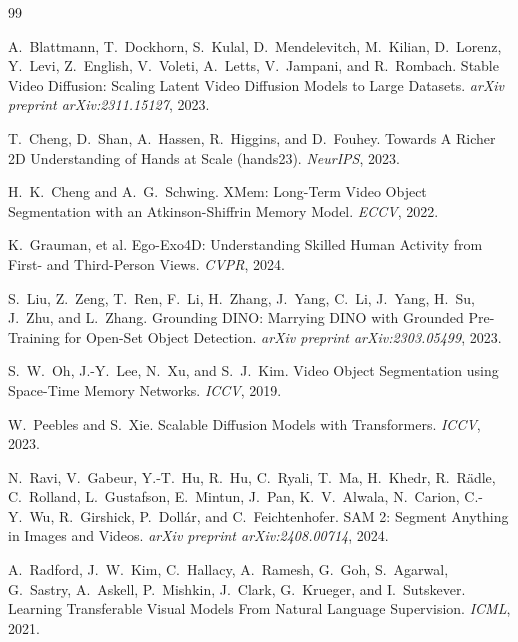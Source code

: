 \documentclass{article} %
\begin{document}

\begin{thebibliography}{99}

A.\ Blattmann, T.\ Dockhorn, S.\ Kulal, D.\ Mendelevitch, M.\ Kilian,
D.\ Lorenz, Y.\ Levi, Z.\ English, V.\ Voleti, A.\ Letts, V.\ Jampani, and
R.\ Rombach.
\newblock Stable Video Diffusion: Scaling Latent Video Diffusion Models to
Large Datasets.
\newblock \emph{arXiv preprint arXiv:2311.15127}, 2023.

T.\ Cheng, D.\ Shan, A.\ Hassen, R.\ Higgins, and D.\ Fouhey.
\newblock Towards A Richer 2D Understanding of Hands at Scale (hands23).
\newblock \emph{NeurIPS}, 2023.

H.\ K.\ Cheng and A.\ G.\ Schwing.
\newblock XMem: Long-Term Video Object Segmentation with an Atkinson-Shiffrin
Memory Model.
\newblock \emph{ECCV}, 2022.

K.\ Grauman, et al.
\newblock Ego-Exo4D: Understanding Skilled Human Activity from First- and
Third-Person Views.
\newblock \emph{CVPR}, 2024.

S.\ Liu, Z.\ Zeng, T.\ Ren, F.\ Li, H.\ Zhang, J.\ Yang, C.\ Li, J.\ Yang,
H.\ Su, J.\ Zhu, and L.\ Zhang.
\newblock Grounding DINO: Marrying DINO with Grounded Pre-Training for
Open-Set Object Detection.
\newblock \emph{arXiv preprint arXiv:2303.05499}, 2023.

S.\ W.\ Oh, J.-Y.\ Lee, N.\ Xu, and S.\ J.\ Kim.
\newblock Video Object Segmentation using Space-Time Memory Networks.
\newblock \emph{ICCV}, 2019.

W.\ Peebles and S.\ Xie.
\newblock Scalable Diffusion Models with Transformers.
\newblock \emph{ICCV}, 2023.

N.\ Ravi, V.\ Gabeur, Y.-T.\ Hu, R.\ Hu, C.\ Ryali, T.\ Ma, H.\ Khedr,
R.\ R\"adle, C.\ Rolland, L.\ Gustafson, E.\ Mintun, J.\ Pan, K.\ V.\ Alwala,
N.\ Carion, C.-Y.\ Wu, R.\ Girshick, P.\ Doll\'ar, and C.\ Feichtenhofer.
\newblock SAM 2: Segment Anything in Images and Videos.
\newblock \emph{arXiv preprint arXiv:2408.00714}, 2024.

A.\ Radford, J.\ W.\ Kim, C.\ Hallacy, A.\ Ramesh, G.\ Goh, S.\ Agarwal,
G.\ Sastry, A.\ Askell, P.\ Mishkin, J.\ Clark, G.\ Krueger, and I.\ Sutskever.
\newblock Learning Transferable Visual Models From Natural Language Supervision.
\newblock \emph{ICML}, 2021.


\end{thebibliography}
\end{document}
